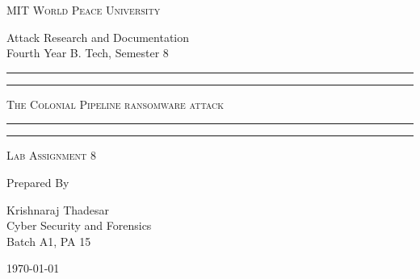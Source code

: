 \documentclass[11pt]{article}
\begin{document}
\begin{titlepage}
	\centering


	\huge\textsc{
		MIT World Peace University
	}\\

	\vspace{0.75\baselineskip} %

	\LARGE{
		Attack Research and Documentation\\
		Fourth Year B. Tech, Semester 8
	}

	\vfill %


	\rule{\textwidth}{1.6pt}\vspace*{-\baselineskip}\vspace*{2pt}
	\rule{\textwidth}{0.6pt}
	\vspace{0.75\baselineskip} %

	\huge{\textsc{
        The Colonial Pipeline ransomware attack
        }} \\

	\vspace{0.5\baselineskip} %
	\rule{\textwidth}{0.6pt}\vspace*{-\baselineskip}\vspace*{2.8pt}
	\rule{\textwidth}{1.6pt}

	\vspace{1\baselineskip} %


	\LARGE\textsc{
		Lab Assignment 8
	} %
	\vfill


	Prepared By \vspace{0.5\baselineskip} %

	\Large{
		Krishnaraj Thadesar \\
		Cyber Security and Forensics\\
        Batch A1, PA 15
	}

	\vspace{0.5\baselineskip} %
	\today

\end{titlepage}
\end{document}
